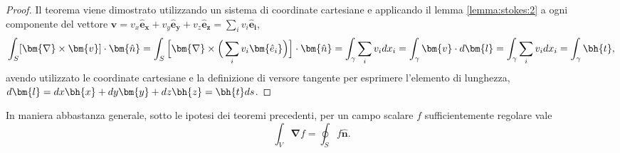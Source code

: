 \begin{proof}
Il teorema viene dimostrato utilizzando un sistema di coordinate cartesiane e applicando il lemma \ref{lemma:stokes:2} a ogni componente del vettore $\bm{v} = v_x \bm{\hat{e}_x} + v_y \bm{\hat{e}_y} + v_z \bm{\hat{e}_z} = \sum_i v_i \bm{\hat{e}_i}$,
\begin{equation}
\int_S [\bm{\nabla} \times \bm{v}] \cdot \bm{\hat{n}} = 
\int_S \Big[\bm{\nabla} \times \Big(\sum_i v_i \bm{\hat{e}_i}\Big)\Big] \cdot \bm{\hat{n}} =
\int_{\gamma} \sum_i v_i dx_i = \int_{\gamma} \bm{v} \cdot d\bm{l} =
\int_{\gamma} \sum_i v_i dx_i = \int_{\gamma} \bh{t} ,
\end{equation}
 avendo utilizzato le coordinate cartesiane e la definizione di versore tangente per esprimere l'elemento di lunghezza, $d\bm{l} = dx \bh{x} + dy \bm{y} + dz \bh{z} = \bh{t} ds$.
\end{proof}

\begin{theorem} In maniera abbastanza generale, sotto le ipotesi dei teoremi precedenti, per un campo scalare $f$ sufficientemente regolare vale
\begin{equation}
  \int_V \bm{\nabla} f = \oint_S f \hat{\bm{n}} .
\end{equation}
\end{theorem}

